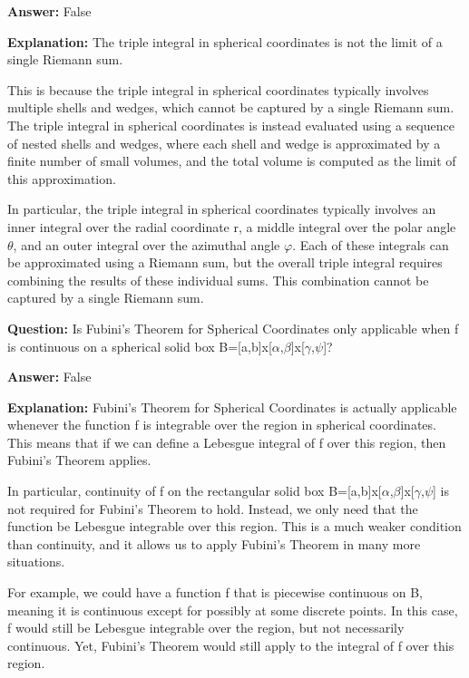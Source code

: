 \documentclass{article}
\begin{document}
                \textbf{Answer:} False

                \textbf{Explanation:} The triple integral in spherical coordinates is not the limit of a single Riemann sum.

This is because the triple integral in spherical coordinates typically involves multiple shells and wedges, which cannot be captured by a single Riemann sum. The triple integral in spherical coordinates is instead evaluated using a sequence of nested shells and wedges, where each shell and wedge is approximated by a finite number of small volumes, and the total volume is computed as the limit of this approximation.

In particular, the triple integral in spherical coordinates typically involves an inner integral over the radial coordinate r, a middle integral over the polar angle \ensuremath{\theta}, and an outer integral over the azimuthal angle \ensuremath{\varphi}. Each of these integrals can be approximated using a Riemann sum, but the overall triple integral requires combining the results of these individual sums. This combination cannot be captured by a single Riemann sum.
                
                \vspace{0.5cm} 
        
            
                \textbf {Question:} Is Fubini's Theorem for Spherical Coordinates only applicable when f is continuous on a spherical solid box B=[a,b]x[\ensuremath{\alpha},\ensuremath{\beta}]x[\ensuremath{\gamma},\ensuremath{\psi}]?
                
                \textbf{Answer:} False

                \textbf{Explanation:} Fubini's Theorem for Spherical Coordinates is actually applicable whenever the function f is integrable over the region in spherical coordinates. This means that if we can define a Lebesgue integral of f over this region, then Fubini's Theorem applies.

In particular, continuity of f on the rectangular solid box B=[a,b]x[\ensuremath{\alpha},\ensuremath{\beta}]x[\ensuremath{\gamma},\ensuremath{\psi}] is not required for Fubini's Theorem to hold. Instead, we only need that the function be Lebesgue integrable over this region. This is a much weaker condition than continuity, and it allows us to apply Fubini's Theorem in many more situations.

For example, we could have a function f that is piecewise continuous on B, meaning it is continuous except for possibly at some discrete points. In this case, f would still be Lebesgue integrable over the region, but not necessarily continuous. Yet, Fubini's Theorem would still apply to the integral of f over this region.
\end{document}
